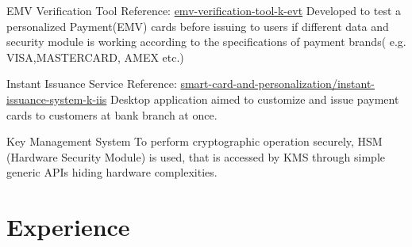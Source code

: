 \documentclass[10pt,a4paper,sans]{moderncv} %
\begin{document}
{EMV Verification Tool}
{}
{Reference: \href{https://konasl.com/smart-card-and-personalization/emv-verification-tool-k-evt}{emv-verification-tool-k-evt}}
{}
{Developed to test a personalized Payment(EMV) cards before issuing to users if different data and security module is working according to the specifications of payment brands( e.g. VISA,MASTERCARD, AMEX etc.)}





{Instant Issuance Service}
{}
{Reference: \href{https://konasl.com/smart-card-and-personalization/instant-issuance-system-k-iis}{smart-card-and-personalization/instant-issuance-system-k-iis}}
{}
{Desktop application aimed to customize and issue payment cards to customers at bank branch at once.}




{Key Management System}
{}
{}
{}
{
To perform cryptographic operation securely, HSM (Hardware Security Module) is used, that is accessed by KMS through simple generic APIs hiding hardware complexities.
}








\section{Experience}
  
\end{document}
